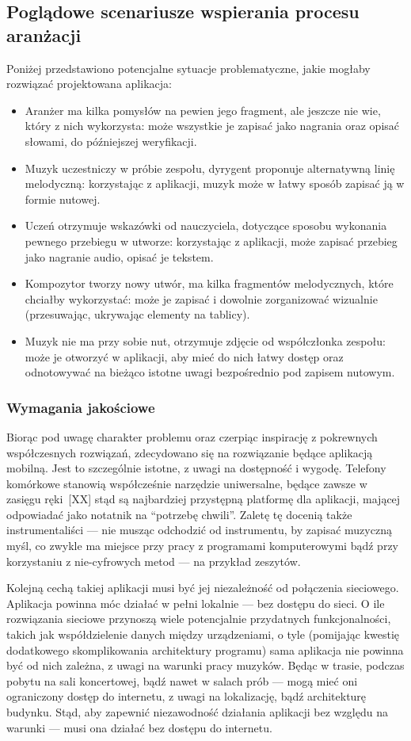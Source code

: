 \documentclass[12pt]{article}
\begin{document}
\subsection{Poglądowe scenariusze wspierania procesu aranżacji}
Poniżej przedstawiono potencjalne sytuacje problematyczne, jakie mogłaby rozwiązać projektowana aplikacja:
\begin{itemize}
	\item Aranżer ma kilka pomysłów na pewien jego fragment, ale jeszcze nie wie, który z nich wykorzysta:
	      może wszystkie je zapisać jako nagrania oraz opisać słowami, do późniejszej weryfikacji.
	\item Muzyk uczestniczy w próbie zespołu, dyrygent proponuje alternatywną linię melodyczną:
	      korzystając z aplikacji, muzyk może w łatwy sposób zapisać ją w formie nutowej.
	\item Uczeń otrzymuje wskazówki od nauczyciela, dotyczące sposobu wykonania pewnego przebiegu w utworze:
	      korzystając z aplikacji, może zapisać przebieg jako nagranie audio, opisać je tekstem.
	\item Kompozytor tworzy nowy utwór, ma kilka fragmentów melodycznych, które chciałby wykorzystać:
	      może je zapisać i dowolnie zorganizować wizualnie (przesuwając, ukrywając elementy na tablicy).
	\item Muzyk nie ma przy sobie nut, otrzymuje zdjęcie od współczłonka zespołu:
	      może je otworzyć w aplikacji, aby mieć do nich łatwy dostęp oraz odnotowywać na bieżąco istotne uwagi bezpośrednio
	      pod zapisem nutowym.
\end{itemize}

\subsubsection{Wymagania jakościowe}
Biorąc pod uwagę charakter problemu oraz czerpiąc inspirację z pokrewnych współczesnych rozwiązań,
zdecydowano się na rozwiązanie będące aplikacją mobilną.
Jest to szczególnie istotne, z uwagi na dostępność i wygodę.
Telefony komórkowe stanowią współcześnie narzędzie uniwersalne, będące zawsze w zasięgu ręki~[XX]
stąd są najbardziej przystępną platformę dla aplikacji, mającej odpowiadać jako notatnik na \enquote{potrzebę chwili}.
Zaletę tę docenią także instrumentaliści — nie musząc odchodzić od instrumentu, by zapisać muzyczną myśl,
co zwykle ma miejsce przy pracy z programami komputerowymi bądź przy korzystaniu z nie-cyfrowych metod
— na przykład zeszytów.

Kolejną cechą takiej aplikacji musi być jej niezależność od połączenia sieciowego.
Aplikacja powinna móc działać w pełni lokalnie — bez dostępu do sieci.
O ile rozwiązania sieciowe przynoszą wiele potencjalnie przydatnych funkcjonalności,
takich jak współdzielenie danych między urządzeniami,
o tyle (pomijając kwestię dodatkowego skomplikowania architektury programu)
sama aplikacja nie powinna być od nich zależna, z uwagi na warunki pracy muzyków.
Będąc w trasie, podczas pobytu na sali koncertowej, bądź nawet w salach prób — mogą mieć oni ograniczony dostęp do internetu,
z uwagi na lokalizację, bądź architekturę budynku.
Stąd, aby zapewnić niezawodność działania aplikacji bez względu na warunki — musi ona działać bez dostępu do internetu.
\end{document}
